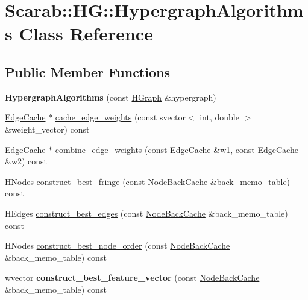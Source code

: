 \hypertarget{classScarab_1_1HG_1_1HypergraphAlgorithms}{
\section{Scarab::HG::HypergraphAlgorithms Class Reference}
\label{classScarab_1_1HG_1_1HypergraphAlgorithms}
}
\subsection*{Public Member Functions}
\begin{DoxyCompactItemize}
\item 
\hypertarget{classScarab_1_1HG_1_1HypergraphAlgorithms_a71e2da9111a9a484e5ef370991fdb6aa}{
{\bfseries HypergraphAlgorithms} (const \hyperlink{classScarab_1_1HG_1_1HGraph}{HGraph} \&hypergraph)}
\label{classScarab_1_1HG_1_1HypergraphAlgorithms_a71e2da9111a9a484e5ef370991fdb6aa}

\item 
\hyperlink{classCache}{EdgeCache} $\ast$ \hyperlink{classScarab_1_1HG_1_1HypergraphAlgorithms_a28f83d7616f6153ca7c909fe82c5b0fa}{cache\_\-edge\_\-weights} (const svector$<$ int, double $>$ \&weight\_\-vector) const 
\item 
\hyperlink{classCache}{EdgeCache} $\ast$ \hyperlink{classScarab_1_1HG_1_1HypergraphAlgorithms_ae815dc19968e9ab557d19dd2563fca38}{combine\_\-edge\_\-weights} (const \hyperlink{classCache}{EdgeCache} \&w1, const \hyperlink{classCache}{EdgeCache} \&w2) const 
\item 
HNodes \hyperlink{classScarab_1_1HG_1_1HypergraphAlgorithms_af5bcb325e1d58dd9d4c26517c4dfeca0}{construct\_\-best\_\-fringe} (const \hyperlink{classCache}{NodeBackCache} \&back\_\-memo\_\-table) const 
\item 
HEdges \hyperlink{classScarab_1_1HG_1_1HypergraphAlgorithms_ab054762a5d6a0af7ee667c8e90585668}{construct\_\-best\_\-edges} (const \hyperlink{classCache}{NodeBackCache} \&back\_\-memo\_\-table) const 
\item 
HNodes \hyperlink{classScarab_1_1HG_1_1HypergraphAlgorithms_acf3eea6f89752404f12c0a3dd45d397d}{construct\_\-best\_\-node\_\-order} (const \hyperlink{classCache}{NodeBackCache} \&back\_\-memo\_\-table) const 
\item 
\hypertarget{classScarab_1_1HG_1_1HypergraphAlgorithms_a4ff84fd293173b5cee2f902a3509a5c2}{
wvector {\bfseries construct\_\-best\_\-feature\_\-vector} (const \hyperlink{classCache}{NodeBackCache} \&back\_\-memo\_\-table) const }
\label{classScarab_1_1HG_1_1HypergraphAlgorithms_a4ff84fd293173b5cee2f902a3509a5c2}


\end{DoxyCompactItemize}
